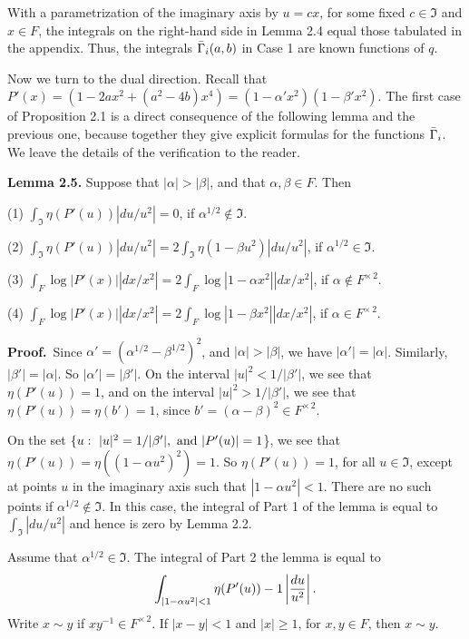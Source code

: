 With a parametrization of the imaginary axis by $u = cx$, for some 
fixed $c\in \Im$
and $x\in F$, the integrals on the right-hand side 
in Lemma 2.4 equal those tabulated
in the appendix.  Thus, the integrals $\bar\Gamma_i(a,b)$ in Case 1
are known functions
of $q$.

Now we turn to the dual direction.  Recall that $P'(x) = (1-2ax^2+(a^2-4b)x^4)
= (1-\alpha'x^2)(1-\beta'x^2)$.  The first case of Proposition 2.1
is a direct 
consequence of the following lemma and the previous one, because
together they give explicit formulas for the functions $\bar\Gamma_i$.
We leave the details of
the verification to the reader.

\bigskip
\noindent
{{\bf Lemma 2.5.}  Suppose that $|\alpha|>|\beta|$, and that $\alpha,\beta\in F$.
Then
\parskip=0pt

(1)  $\int_{\Im}\eta(P'(u)) |du/u^2| = 0$, if $\alpha^{1/2}\not\in\Im$.

(2)  $\int_{\Im}\eta(P'(u)) |du/u^2| = 2\int_{\Im}\eta(1-\beta u^2)|du/u^2|$,
       if $\alpha^{1/2}\in \Im$.

(3)  $\int_{F}\log|P'(x)| |dx/x^2| = 2\int_{F}
        \log|1-\alpha x^2| |dx/x^2|$,
       if $\alpha\not\in F^{\times\,2}$.

(4) $\int_{F}\log|P'(x)| |dx/x^2| = 2\int_{F}\log|1-\beta x^2|
     |dx/x^2|$, if $\alpha\in F^{\times\,2}$.

}

\bigskip
\noindent
{\bf Proof.}\  Since $\alpha'=(\alpha^{1/2}-\beta^{1/2})^2$, and $|\alpha|>|\beta|$,
we have $|\alpha'| = |\alpha|$.  Similarly, $|\beta'| =|\alpha|$.  So
$|\alpha'|=|\beta'|$.  On the interval $|u|^2 < 1/|\beta'|$,
we see that $\eta(P'(u)) = 1$, and on the interval $|u|^2 > 1/|\beta'|$,
we see that $\eta(P'(u)) = \eta(b') = 1$, since $b'=(\alpha-\beta)^2\in
F^{\times\, 2}$.

On the set $\{u:\ |u|^2 = 1/|\beta'|,\hbox{ and }|P'(u)|=1$\},
we see that $\eta(P'(u)) = \eta((1-\alpha u^2)^2) = 1$.
So $\eta(P'(u)) = 1$, for all $u\in \Im$, except at points $u$
in the imaginary axis such that $|1-\alpha u^2|<1$.  There are
no such points if $\alpha^{1/2}\not\in\Im$.  
In this case, the integral of Part 1 of the lemma is 
equal to $\int_{\Im} |du/u^2|$ and hence is zero by Lemma 2.2.

Assume that $\alpha^{1/2}\in \Im$.  The integral of Part 2
the lemma is equal to 
$$\int _{|1-\alpha u^2|<1} \eta(P'(u)) -1 \left | {du\over u^2}\right |.$$
Write $x \sim y$ if $xy^{-1}\in F^{\times\,2}$.
If $|x-y|<1$ and $|x|\ge 1$, for $x,y\in F$, 
then $x\sim y$.

